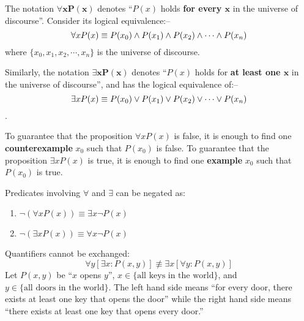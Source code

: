 \begin{definition}
    The notation $\boldsymbol{\forall x P(x)}$
    denotes ``$P(x)$ holds \textbf{for every $\boldsymbol{x}$} in the universe of discourse''.
    Consider its logical equivalence:--
    $$
    \forall x P(x) \equiv P(x_0) \wedge P(x_1) \wedge P(x_2) \wedge \cdots \wedge P(x_n)
    $$
    where $\{x_0, x_1, x_2, \cdots, x_n\}$ is the universe of discourse.

    Similarly, the notation $\boldsymbol{\exists x P(x)}$ denotes ``$P(x)$ holds for \textbf{at least one $\boldsymbol{x}$}
    in the universe of discourse'', and has the logical equivalence of:--
    $$
    \exists x P(x) \equiv P(x_0) \vee P(x_1) \vee P(x_2) \vee \cdots \vee P(x_n)
    $$.
\end{definition}

\begin{theorem}
    To guarantee that the proposition $\forall x P(x)$ is false, it is enough to find one
    \textbf{counterexample} $x_0$ such that $P(x_0)$ is false.
    To guarantee that the proposition $\exists x P(x)$ is true, it is enough to find one
    \textbf{example} $x_0$ such that $P(x_0)$ is true.
\end{theorem}

\begin{theorem}
    Predicates involving $\forall$ and $\exists$ can be negated as:
    \begin{multicols}{2}
        \begin{enumerate}
            \item $\neg(\forall xP(x)) \equiv \exists x \neg P(x)$
            \item $\neg(\exists xP(x)) \equiv \forall x \neg P(x)$
        \end{enumerate}
    \end{multicols}
\end{theorem}

\begin{remark}
    Quantifiers cannot be exchanged:
    $$
    \forall y [\exists x : P(x,y)] \nequiv \exists x [\forall y : P(x, y)]
    $$
    Let $P(x,y)$ be ``$x$ opens $y$'', $x\in\{\text{all keys in the world}\}$, and
    $y\in\{\text{all doors in the world}\}$. The left hand side means ``for every door, there exists
    at least one key that opens the door'' while the right hand side means ``there exists
    at least one key that opens every door.''
\end{remark}

